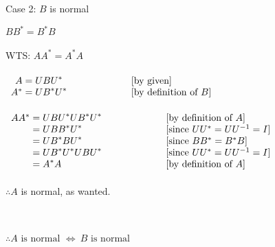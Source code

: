 \documentclass[12pt]{article}
\newenvironment{proofindent}{\vspace*{1mm}\hfill\begin{minipage}{\dimexpr\textwidth-10mm}}{\end{minipage}}
\begin{document}
\noindent Case 2: $B$ is normal

\begin{proofindent}
	$BB^* = B^*B$
	\\\\
	WTS: $AA^* = A^*A$
	\\\\
	{$\begin{array}{r@{}>{\displaystyle}ll}
			A   & {}= UBU^*                  & [\text{by given}]\vspace*{0mm} \\
			A^* & {}= UB^*U^* \hspace*{20mm} & [\text{by definition of } B]   \\
		\end{array}$}
	\\\\
	{$\begin{array}{r@{}>{\displaystyle}ll}
			AA^* & {}= UBU^* UB^*U^* \hspace*{20mm} & [\text{by definition of } A]       \\
			     & {}= UBB^*U^*                     & [\text{since } UU^* = UU^{-1} = I] \\
			     & {}= UB^*BU^*                     & [\text{since } BB^* = B^*B]        \\
			     & {}= UB^*U^*UBU^*                 & [\text{since } UU^* = UU^{-1} = I] \\
			     & {}= A^*A                         & [\text{by definition of } A]       \\
		\end{array}$}\\\\
	$\therefore A$ is normal, as wanted.
\end{proofindent}\\\\
$\therefore A \text{ is normal } \iff \ B \text{ is normal}$ \newpage
\end{document}
